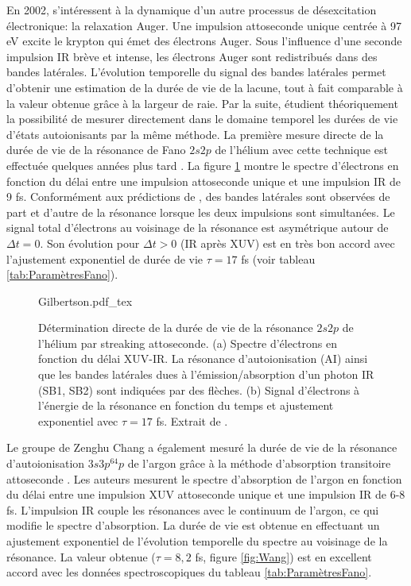 En 2002,  s'intéressent à la dynamique d'un autre processus de désexcitation électronique: la relaxation Auger. Une impulsion attoseconde unique centrée à 97 eV excite le krypton qui émet des électrons Auger. Sous l'influence d'une seconde impulsion IR brève et intense, les électrons Auger sont redistribués dans des bandes latérales. L'évolution temporelle du signal des bandes latérales permet d'obtenir une estimation de la durée de vie de la lacune, tout à fait comparable à la valeur obtenue grâce à la largeur de raie. Par la suite,  étudient théoriquement la possibilité de mesurer directement dans le domaine temporel les durées de vie d'états autoionisants par la même méthode. La première mesure directe de la durée de vie de la résonance de Fano $2s2p$ de l'hélium avec cette technique est effectuée quelques années plus tard . La figure \ref{fig:Gilbertson} montre le spectre d'électrons en fonction du délai entre une impulsion attoseconde unique et une impulsion IR de 9 fs. Conformément aux prédictions de , des bandes latérales sont observées de part et d'autre de la résonance lorsque les deux impulsions sont simultanées. Le signal total d'électrons au voisinage de la résonance est asymétrique autour de $\Delta t = 0$. Son évolution pour $\Delta t > 0$ (IR après XUV) est en très bon accord avec l'ajustement exponentiel de durée de vie $\tau = 17$ fs (voir tableau \ref{tab:ParamètresFano}).

\begin{figure}
\centering
\def\svgwidth{0.9\textwidth}
{Gilbertson.pdf_tex}
\caption{Détermination directe de la durée de vie de la résonance $2s2p$ de l'hélium par streaking attoseconde. (a) Spectre d'électrons en fonction du délai XUV-IR. La résonance d'autoionisation (AI) ainsi que les bandes latérales dues à l'émission/absorption d'un photon IR (SB1, SB2) sont indiquées par des flèches. (b) Signal d'électrons à l'énergie de la résonance en fonction du temps et ajustement exponentiel avec $\tau = 17$ fs. Extrait de .}
\label{fig:Gilbertson}
\end{figure}

Le groupe de Zenghu Chang a également mesuré la durée de vie de la résonance d'autoionisation $3s3p^64p$ de l'argon grâce à la méthode d'absorption transitoire attoseconde . Les auteurs mesurent le spectre d'absorption de l'argon en fonction du délai entre une impulsion XUV attoseconde unique et une impulsion IR de 6-8 fs. L'impulsion IR couple les résonances avec le continuum de l'argon, ce qui modifie le spectre d'absorption. La durée de vie est obtenue en effectuant un ajustement exponentiel de l'évolution temporelle du spectre au voisinage de la résonance. La valeur obtenue ($\tau = 8,2$ fs, figure \ref{fig:Wang}) est en excellent accord avec les données spectroscopiques du tableau \ref{tab:ParamètresFano}.

